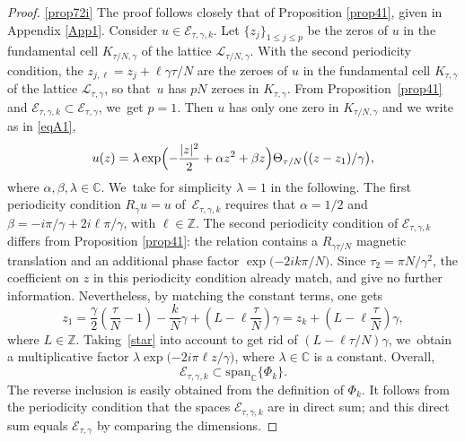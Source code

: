 \documentclass[10pt]{amsart}
\theoremstyle{definition}
\let\EE\exp
\newcommand\C{\mathbb C}
\newcommand\Z{\mathbb Z}
\newcommand{\pa}[1]{\left(#1\right)}
\providecommand{\skpt}{\par\smallskip\noindent}
\begin{document}
\skpt
\begin{proof}

\eqref{prop72i}
The proof follows closely that of Proposition \ref{prop41}, given in Appendix \ref{App1}. Consider $u\in \mathcal{E}_{\tau,\gamma,k}$. Let $\{z_j\}_{1 \leq j \leq p}$ be the zeros of $u$ in the fundamental cell $K_{{\tau}/{N},\gamma}$ of the lattice $\mathcal{L}_{{\tau}/{N},\gamma}$. With the second periodicity condition, the $z_{j,\ell} = z_j + {\ell \gamma \tau}/{N}$ are the zeroes of $u$ in the fundamental cell $K_{\tau,\gamma}$ of the lattice $\mathcal{L}_{\tau,\gamma}$, so that~$u$ has $pN$ zeroes in $K_{\tau,\gamma}$. From Proposition~\ref{prop41} and $\mathcal{E}_{\tau,\gamma,k} \subset \mathcal{E}_{\tau,\gamma}$, we~get $p=1$. Then $u$ has only one zero in $K_{{\tau}/{N},\gamma}$ and we write as in \eqref{eqA1},
\[
u(z) = \lambda \EE \Bigl({-\frac{|z|^2}{2} + \alpha z^2 + \beta z}\Bigr) \Theta_{{\tau}/{N}}\bigl((z-z_{1})/\gamma\bigr), 
\]
where $\alpha,\beta, \lambda \in \mathbb{C}$. We~take for simplicity $\lambda =1$ in the following. The first periodicity condition $R_\gamma u = u$ of~$\mathcal{E}_{\tau,\gamma,k}$ requires that $\alpha = {1}/{2}$ and $\beta = -{i\pi}/{\gamma} + {2i\ell\pi}/{\gamma}$, with $\ell \in \mathbb{Z}$.
The second periodicity condition of $\mathcal{E}_{\tau,\gamma,k}$ differs from Proposition \ref{prop41}: the relation contains a $R_{{\gamma\tau}/{N}}$ magnetic translation and an additional phase factor $\EE\bigl({-{2ik\pi}/{N}}\bigr)$. Since $\tau_2 = {\pi N}/{\gamma^2}$, the coefficient on $z$ in this periodicity condition already match, and give no further information. Nevertheless, by matching the constant terms, one gets
\[
z_1 = \frac{\gamma}{2}\pa{\frac{\tau}{N}-1} - \frac{k}{N}\gamma + \pa{L-\ell\frac{\tau}{N}}\gamma = z_k + \pa{L-\ell\frac{\tau}{N}}\gamma,
\]
where $L \in \Z$. Taking~\eqref{star} into account to get rid of $ \pa{L-\ell {\tau}/{N}}\gamma$, we~obtain a multiplicative factor $\lambda \EE\bigl({-{2i\pi \ell z}/{\gamma}}\bigr)$, where $\lambda \in \C$ is a constant. Overall,
\[
\mathcal{E}_{\tau,\gamma,k} \subset \text{span}_\C\{\Phi_k\}.
\]
The reverse inclusion is easily obtained from the definition of $\Phi_k$.
It follows from the periodicity condition that the spaces $\mathcal{E}_{\tau,\gamma,k}$ are in direct sum; and this direct sum equals $\mathcal{E}_{\tau,\gamma}$ by comparing the dimensions.


\end{proof}
\end{document}
